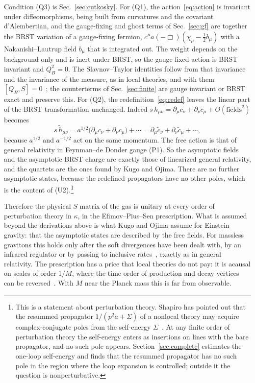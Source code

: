 \documentclass[a4paper,11pt]{article}
\begin{document}
Condition (Q3) is Sec.~\ref{sec:cutkosky}. For (Q1), the action~\eqref{eq:action} is invariant under diffeomorphisms, being built from curvatures and the covariant d'Alembertian, and the gauge-fixing and ghost terms of Sec.~\ref{sec:gf} are together the BRST variation of a gauge-fixing fermion, $\bar c^\mu a(-\bar\Box)(\chi_\mu-\frac12 b_\mu)$ with a Nakanishi--Lautrup field $b_\mu$ that is integrated out. The weight depends on the background only and is inert under BRST, so the gauge-fixed action is BRST invariant and $Q_B^2=0$. The Slavnov--Taylor identities follow from that invariance and the invariance of the measure, as in local theories, and with them $[Q_B,S]=0$~\cite{KugoOjima1978}; the counterterms of Sec.~\ref{sec:finite} are gauge invariant or BRST exact and preserve this. For (Q2), the redefinition~\eqref{eq:redef} leaves the linear part of the BRST transformation unchanged. Indeed $s\,h_{\mu\nu}=\partial_\mu c_\nu+\partial_\nu c_\mu+O(\text{fields}^2)$ becomes
\[
s\,\tilde h_{\mu\nu}=a^{1/2}\bigl(\partial_\mu c_\nu+\partial_\nu c_\mu\bigr)+\cdots=\partial_\mu\tilde c_\nu+\partial_\nu\tilde c_\mu+\cdots,
\]
because $a^{1/2}$ and $a^{-1/2}$ act on the same momentum. The free action is that of general relativity in Feynman--de Donder gauge (P1). So the asymptotic fields and the asymptotic BRST charge are exactly those of linearized general relativity, and the quartets are the ones found by Kugo and Ojima. There are no further asymptotic states, because the redefined propagators have no other poles, which is the content of (U2).\footnote{This is a statement about perturbation theory. Shapiro has pointed out that the resummed propagator $1/(p^2a+\Sigma)$ of a nonlocal theory may acquire complex-conjugate poles from the self-energy $\Sigma$~\cite{Shapiro2015}. At any finite order of perturbation theory the self-energy enters as insertions on lines with the bare propagator, and no such pole appears. Section~\ref{sec:complete} estimates the one-loop self-energy and finds that the resummed propagator has no such pole in the region where the loop expansion is controlled; outside it the question is nonperturbative.}

Therefore the physical $S$ matrix of the gas is unitary at every order of perturbation theory in $\kappa$, in the Efimov--Pius--Sen prescription. What is assumed beyond the derivations above is what Kugo and Ojima assume for Einstein gravity: that the asymptotic states are described by the free fields. For massless gravitons this holds only after the soft divergences have been dealt with, by an infrared regulator or by passing to inclusive rates~\cite{Weinberg1965}, exactly as in general relativity. The prescription has a price that local theories do not pay: it is acausal on scales of order $1/M$, where the time order of production and decay vertices can be reversed~\cite{Carone2017}. With $M$ near the Planck mass this is far from observable.
\end{document}
